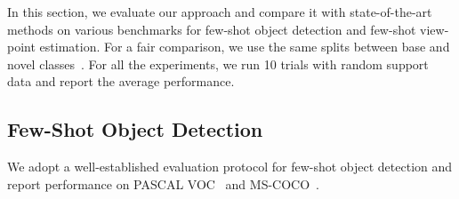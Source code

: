 \documentclass[runningheads]{llncs}
\begin{document}
In this section, we evaluate our approach and compare it with state-of-the-art methods on various benchmarks for few-shot object detection and few-shot view-point estimation. 
For a fair comparison, we use the same splits between base and novel classes~\cite{YOLO-FS2019,Tseng2019FewShotVE}.
For all the experiments, we run 10 trials with random support data and report the average performance.


\subsection{Few-Shot Object Detection}
\label{sec:ExpDet}

We adopt a well-established evaluation protocol for few-shot object detection \cite{YOLO-FS2019,MetaDet2019,metarcnn2019} and report performance on PASCAL VOC~\cite{PascalVOC10,PascalVOC15} and MS-COCO~\cite{Lin2014MicrosoftCOCO}.
\end{document}
